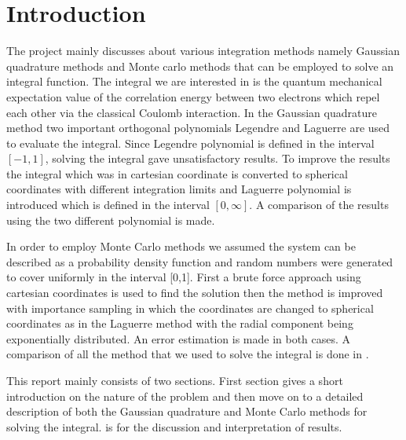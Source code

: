 \chapter{Introduction}

The project mainly discusses about various integration methods namely Gaussian quadrature methods and Monte carlo methods that can be employed to solve an integral function. The integral we are interested in is the quantum mechanical expectation value of the correlation energy between two electrons which repel each other via the classical Coulomb interaction. 
In the Gaussian quadrature method two important orthogonal polynomials Legendre and Laguerre are used to evaluate the integral. Since Legendre polynomial is defined in the interval $[-1,1]$, solving the integral gave unsatisfactory results. To improve the results the integral which was in cartesian coordinate is converted to spherical coordinates with different integration limits and Laguerre polynomial is introduced which is defined in the interval $[0,\infty]$. 
A comparison of the results using the two different polynomial is made. 

In order to employ Monte Carlo methods we assumed the system can be described as a probability density function and random numbers were generated to cover uniformly in the interval [0,1]. 
First a brute force approach using cartesian coordinates is used to find the solution then the method is improved with importance sampling in which the coordinates are changed to spherical coordinates as in the Laguerre method with the radial component being exponentially distributed. 
An error estimation is made in both cases. A comparison of all the method that we used to solve the integral is done in .

This report mainly consists of two sections.  First section gives a short introduction on the nature of the problem and then move on to a detailed description of both the Gaussian quadrature and Monte Carlo methods for solving the integral.  is for the discussion and interpretation of results.